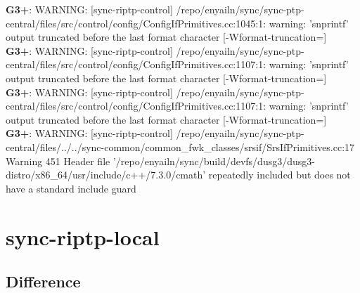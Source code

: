 \documentclass[12pt,twoside]{article}
\begin{document}
\textbf{G3+}: WARNING: [sync-riptp-control] /repo/enyailn/sync/sync-ptp-central/files/src/control/config/ConfigIfPrimitives.cc:1045:1: warning: 'snprintf' output truncated before the last format character [-Wformat-truncation=]\\ 
\textbf{G3+}: WARNING: [sync-riptp-control] /repo/enyailn/sync/sync-ptp-central/files/src/control/config/ConfigIfPrimitives.cc:1107:1: warning: 'snprintf' output truncated before the last format character [-Wformat-truncation=]\\ 
\textbf{G3+}: WARNING: [sync-riptp-control] /repo/enyailn/sync/sync-ptp-central/files/src/control/config/ConfigIfPrimitives.cc:1107:1: warning: 'snprintf' output truncated before the last format character [-Wformat-truncation=]\\ 
\textbf{G3+}: WARNING: [sync-riptp-control] /repo/enyailn/sync/sync-ptp-central/files/../../sync-common/common\_fwk\_classes/srsif/SrsIfPrimitives.cc:17 Warning 451 Header file '/repo/enyailn/sync/build/devfs/dusg3/dusg3-distro/x86\_64/usr/include/c++/7.3.0/cmath' repeatedly included but does not have a standard include guard\\ 
  
\section{sync-riptp-local} 
\subsection{Difference} 
  
\end{document}
